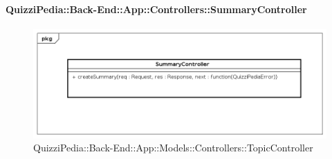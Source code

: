\paragraph{QuizziPedia::Back-End::App::Controllers::SummaryController}
\label{QuizziPedia::Back-End::App::Controllers::SummaryController}
\begin{figure}
	\centering
	\includegraphics[scale=0.45]{UML/Classi/Back-End/QuizziPedia_Back-End_App_Controllers_SummaryController.png}
	\caption{QuizziPedia::Back-End::App::Models::Controllers::TopicController}
\end{figure}

